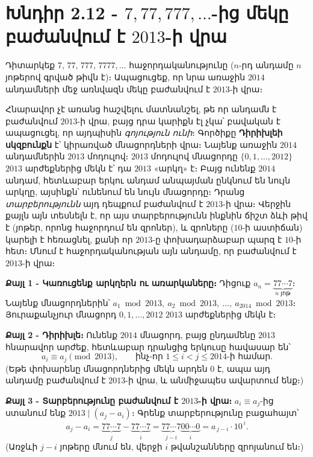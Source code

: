 \documentclass[11pt,a4paper]{article}
\begin{document}
\section*{Խնդիր 2.12 - $7,77,777,\dots$-ից մեկը բաժանվում է $2013$-ի վրա}

\begin{problembox}[2.12]
Դիտարկեք $7,\,77,\,777,\,7777,\dots$ հաջորդականությունը ($n$-րդ անդամը $n$ յոթերով գրված թիվն է)։
Ապացուցեք, որ նրա առաջին $2014$ անդամների մեջ առնվազն մեկը բաժանվում է $2013$-ի վրա։
\end{problembox}

\begin{ideabox}
Հնարավոր չէ առանց հաշվելու մատնանշել, թե որ անդամն է բաժանվում $2013$-ի վրա, բայց դրա կարիքն էլ չկա՝ բավական է
ապացուցել, որ այդպիսին \emph{գոյություն ունի}։ Գործիքը \textbf{Դիրիխլեի սկզբունքն} է՝ կիրառված
մնացորդների վրա։ Նայենք առաջին $2014$ անդամներին $2013$ մոդուլով։ $2013$ մոդուլով մնացորդը
$\{0,1,\dots,2012\}$ $2013$ արժեքներից մեկն է՝ դա $2013$ «արկղ» է։ Բայց ունենք $2014$ անդամ,
հետևաբար երկու անդամ անպայման ընկնում են նույն արկղը, այսինքն՝ ունենում են նույն մնացորդը։ Դրանց
\emph{տարբերությունն} այդ դեպքում բաժանվում է $2013$-ի վրա։ Վերջին քայլն այն տեսնելն է, որ այս
տարբերությունն ինքնին ճիշտ ձևի թիվ է (յոթեր, որոնց հաջորդում են զրոներ), և զրոները ($10$-ի աստիճան)
կարելի է հեռացնել, քանի որ $2013$-ը փոխադարձաբար պարզ է $10$-ի հետ։ Մնում է հաջորդականության այն
անդամը, որ բաժանվում է $2013$-ի վրա։
\end{ideabox}

\textbf{Քայլ 1 - Կառուցենք արկղերն ու առարկաները։}
Դիցուք $a_n = \underbrace{77\cdots7}_{n\text{ յոթ}}$։ Նայենք մնացորդներին՝
$a_1 \bmod 2013,\ a_2\bmod 2013,\ \dots,\ a_{2014}\bmod 2013$։ Յուրաքանչյուր մնացորդ $0,1,\dots,2012$
$2013$ արժեքներից մեկն է։

\textbf{Քայլ 2 - Դիրիխլե։}
Ունենք $2014$ մնացորդ, բայց ընդամենը $2013$ հնարավոր արժեք, հետևաբար դրանցից երկուսը հավասար են՝
\[
a_i \equiv a_j \pmod{2013},\qquad \text{ինչ-որ } 1\le i < j \le 2014 \text{-ի համար} .
\]
(Եթե փոխարենը մնացորդներից մեկն արդեն $0$ է, ապա այդ անդամը բաժանվում է $2013$-ի վրա, և
անմիջապես ավարտում ենք։)

\textbf{Քայլ 3 - Տարբերությունը բաժանվում է $2013$-ի վրա։}
$a_i\equiv a_j$-ից ստանում ենք $2013 \mid (a_j - a_i)$։ Գրենք տարբերությունը բացահայտ՝
\[
a_j - a_i = \underbrace{77\cdots7}_{j} - \underbrace{77\cdots7}_{i}
= \underbrace{77\cdots7}_{\,j-i\,}\underbrace{00\cdots0}_{\,i\,}
= a_{\,j-i}\cdot 10^{\,i}.
\]
(Առջևի $j-i$ յոթերը մնում են, վերջի $i$ թվանշանները զրոյանում են։)
\end{document}
